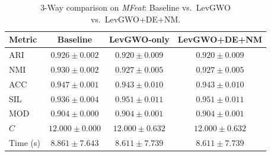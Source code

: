 \begin{table}[htbp]
\centering
\caption{3-Way comparison on \textit{MFeat}: Baseline vs.\ LevGWO vs.\ LevGWO+DE+NM.}
\label{tab:mfeat_3way}
\begin{tabular}{lccc}
\toprule
Metric & Baseline & LevGWO-only & LevGWO+DE+NM \\
\midrule
ARI & $\mathbf{0.926 \pm 0.002}$ & $0.920 \pm 0.009$ & $0.920 \pm 0.009$ \\
NMI & $\mathbf{0.930 \pm 0.002}$ & $0.927 \pm 0.005$ & $0.927 \pm 0.005$ \\
ACC & $\mathbf{0.947 \pm 0.001}$ & $0.943 \pm 0.010$ & $0.943 \pm 0.010$ \\
SIL & $0.936 \pm 0.004$ & $\mathbf{0.951 \pm 0.011}$ & $\mathbf{0.951 \pm 0.011}$ \\
MOD & $0.904 \pm 0.000$ & $\mathbf{0.904 \pm 0.001}$ & $\mathbf{0.904 \pm 0.001}$ \\
$C$ & $12.000 \pm 0.000$ & $12.000 \pm 0.632$ & $12.000 \pm 0.632$ \\
Time (s) & $8.861 \pm 7.643$ & $8.611 \pm 7.739$ & $8.611 \pm 7.739$ \\
\bottomrule
\end{tabular}
\end{table}